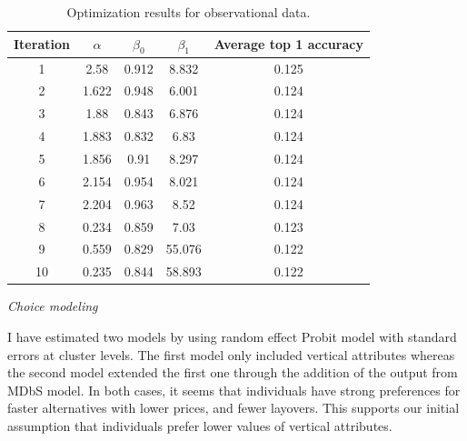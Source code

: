 \documentclass[a4paper,12pt]{article}
\begin{document}
\begin{table}
\centering
\begin{tabular}{ccccc}
\hline
Iteration & $\alpha$ & $\beta_0$ & $\beta_1$ & Average top 1 accuracy \\
\hline
1 & 2.58 & 0.912 & 8.832 & 0.125 \\
2 & 1.622 & 0.948 & 6.001 & 0.124 \\
3 & 1.88 & 0.843 & 6.876 & 0.124 \\
4 & 1.883 & 0.832 & 6.83 & 0.124 \\
5 & 1.856 & 0.91 & 8.297 & 0.124 \\
6 & 2.154 & 0.954 & 8.021 & 0.124 \\
7 & 2.204 & 0.963 & 8.52 & 0.124 \\
8 & 0.234 & 0.859 & 7.03 & 0.123 \\
9 & 0.559 & 0.829 & 55.076 & 0.122 \\
10 & 0.235 & 0.844 & 58.893 & 0.122 \\
\hline
\end{tabular}
\caption{Optimization results for observational data.}
\label{tab:optimizationAmadeusResults}
\end{table}



\textit{Choice modeling}

I have estimated two models by using random effect Probit model with standard errors at cluster levels. The first model only included vertical attributes whereas the second model extended the first one through the addition of the output from MDbS model. In both cases, it seems that individuals have strong preferences for faster alternatives with lower prices, and fewer layovers. This supports our initial assumption that individuals prefer lower values of vertical attributes. 
\end{document}
